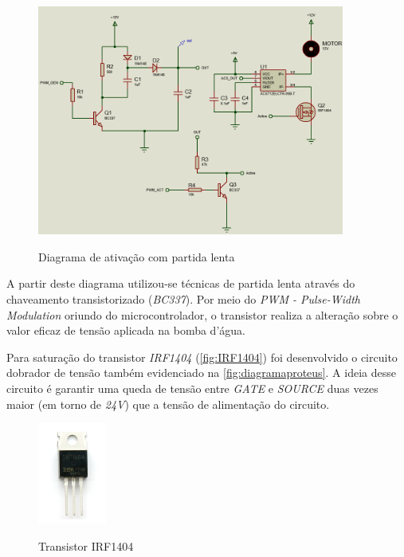 \begin{figure}[H]
	\centering
	\caption{Diagrama de ativação com partida lenta}
	\includegraphics[width=0.9\textwidth]{figuras/diagrama_ativação_bomba.png}
	\label{fig:diagramaproteus}
\end{figure} 

A partir deste diagrama utilizou-se técnicas de partida lenta através do chaveamento transistorizado (\textit{BC337}). Por meio do \textit{PWM - Pulse-Width Modulation} oriundo do microcontrolador, o transistor realiza a alteração sobre o valor eficaz de tensão aplicada na bomba d'água.

Para saturação do transistor \textit{IRF1404} (\autoref{fig:IRF1404}) foi desenvolvido o circuito dobrador de tensão também evidenciado na \autoref{fig:diagramaproteus}. A ideia desse circuito é garantir uma queda de tensão entre \textit{GATE} e \textit{SOURCE} duas vezes maior (em torno de \textit{24V}) que a tensão de alimentação do circuito.

\begin{figure}[H]
	\centering
	\caption{Transistor IRF1404}
	\includegraphics[width=0.2\textwidth]{figuras/IRF1404.png}
	\label{fig:IRF1404}
\end{figure} 

